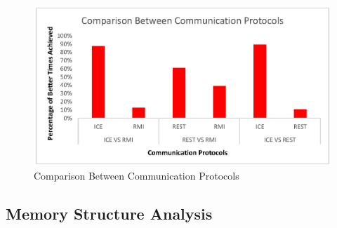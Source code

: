 \begin{figure}
	\centering
	\includegraphics[trim=0.5cm 19cm 1cm 1cm]{fig/comparisonCommunicationProtocols.eps}
	\caption{Comparison Between Communication Protocols}
	\label{fig:comparisonCommunicationProtocols}
\end{figure}



\subsection{Memory Structure Analysis}
\label{subsec:memoryAnalysis}

